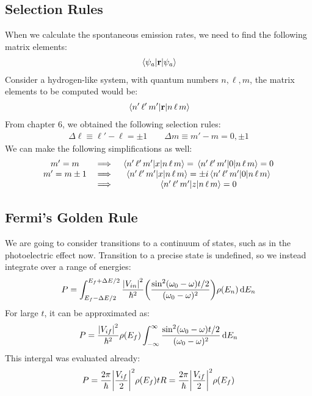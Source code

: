 \subsection{Selection Rules}
When we calculate the spontaneous emission rates, we need to find the following matrix elements:
\begin{align*}
  \mel{\psi_a}{\vb{r}}{\psi_a}
\end{align*}
Consider a hydrogen-like system, with quantum numbers $n,\ell,m$, the matrix elements to be computed would be:
\begin{align*}
  \mel{n'\,\ell'\,m'}{\vb{r}}{n\,\ell\,m}
\end{align*}
From chapter 6, we obtained the following selection rules:
\begin{align*}
  \Delta{\ell}\equiv\ell'-\ell=\pm1\qquad
  \Delta{m}\equiv m'-m=0,\pm1
\end{align*}
We can make the following simplifications as well:
\begin{align*}
  \mqty{
    m'=m & \implies &
    \mel{n'\,\ell'\,m'}{x}{n\,\ell\,m}=\mel{n'\,\ell'\,m'}{0}{n\,\ell\,m}=0\\
    m'=m\pm1 & \implies &
    \mel{n'\,\ell'\,m'}{x}{n\,\ell\,m}=\pm i\mel{n'\,\ell'\,m'}{0}{n\,\ell\,m}\\
    & \implies &
    \mel{n'\,\ell'\,m'}{z}{n\,\ell\,m}=0
  }
\end{align*}
\subsection{Fermi's Golden Rule}
We are going to consider transitions to a continuum of states, such as in the photoelectric effect now. Transition to a precise state is undefined, so we instead integrate over a range of energies:
\begin{align*}
  P=\int_{E_f-\Delta{E}/2}^{E_f+\Delta{E}/2}\frac{\abs{V_{in}}^2}{\hbar^2}
  \qty(\frac{\sin^2(\omega_0-\omega)t/2}{(\omega_0-\omega)^2})\rho(E_n)\dd{E_n}
\end{align*}
For large $t$, it can be approximated as:
\begin{align*}
  P=\frac{\abs{V_{if}}^2}{\hbar^2}\rho(E_f)
  \int_{-\infty}^\infty\frac{\sin^2(\omega_0-\omega)t/2}{(\omega_0-\omega)^2}\dd{E_n}
\end{align*}
This intergal was evaluated already:
\begin{align*}
  P=\frac{2\pi}{\hbar}\abs{\frac{V_{if}}{2}}^2\rho(E_f)t
  R=\frac{2\pi}{\hbar}\abs{\frac{V_{if}}{2}}^2\rho(E_f)
\end{align*}
